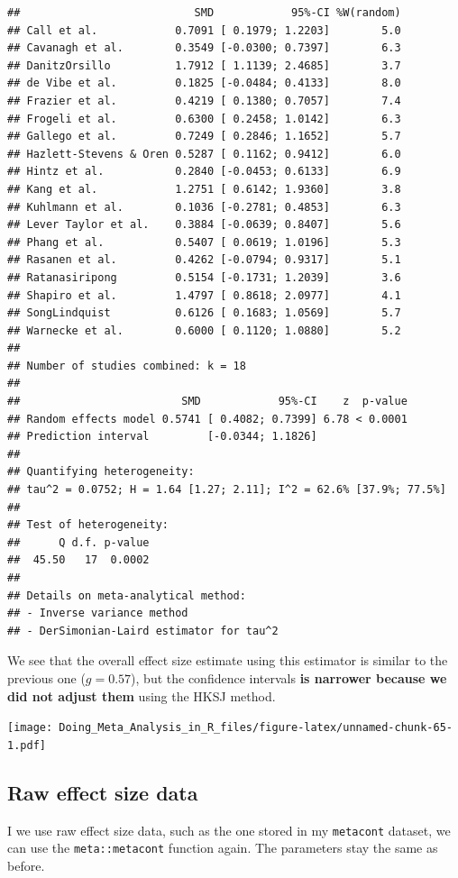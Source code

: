 \documentclass[]{book}
\begin{document}
\begin{verbatim}
##                           SMD            95%-CI %W(random)
## Call et al.            0.7091 [ 0.1979; 1.2203]        5.0
## Cavanagh et al.        0.3549 [-0.0300; 0.7397]        6.3
## DanitzOrsillo          1.7912 [ 1.1139; 2.4685]        3.7
## de Vibe et al.         0.1825 [-0.0484; 0.4133]        8.0
## Frazier et al.         0.4219 [ 0.1380; 0.7057]        7.4
## Frogeli et al.         0.6300 [ 0.2458; 1.0142]        6.3
## Gallego et al.         0.7249 [ 0.2846; 1.1652]        5.7
## Hazlett-Stevens & Oren 0.5287 [ 0.1162; 0.9412]        6.0
## Hintz et al.           0.2840 [-0.0453; 0.6133]        6.9
## Kang et al.            1.2751 [ 0.6142; 1.9360]        3.8
## Kuhlmann et al.        0.1036 [-0.2781; 0.4853]        6.3
## Lever Taylor et al.    0.3884 [-0.0639; 0.8407]        5.6
## Phang et al.           0.5407 [ 0.0619; 1.0196]        5.3
## Rasanen et al.         0.4262 [-0.0794; 0.9317]        5.1
## Ratanasiripong         0.5154 [-0.1731; 1.2039]        3.6
## Shapiro et al.         1.4797 [ 0.8618; 2.0977]        4.1
## SongLindquist          0.6126 [ 0.1683; 1.0569]        5.7
## Warnecke et al.        0.6000 [ 0.1120; 1.0880]        5.2
## 
## Number of studies combined: k = 18
## 
##                         SMD            95%-CI    z  p-value
## Random effects model 0.5741 [ 0.4082; 0.7399] 6.78 < 0.0001
## Prediction interval         [-0.0344; 1.1826]              
## 
## Quantifying heterogeneity:
## tau^2 = 0.0752; H = 1.64 [1.27; 2.11]; I^2 = 62.6% [37.9%; 77.5%]
## 
## Test of heterogeneity:
##      Q d.f. p-value
##  45.50   17  0.0002
## 
## Details on meta-analytical method:
## - Inverse variance method
## - DerSimonian-Laird estimator for tau^2
\end{verbatim}

We see that the overall effect size estimate using this estimator is similar to the previous one (\(g=0.57\)), but the confidence intervals \textbf{is narrower because we did not adjust them} using the HKSJ method.

\texttt{[image: Doing\_Meta\_Analysis\_in\_R\_files/figure-latex/unnamed-chunk-65-1.pdf]}

\hypertarget{random.raw}{%
\subsection{Raw effect size data}\label{random.raw}}

I we use raw effect size data, such as the one stored in my \texttt{metacont} dataset, we can use the \texttt{meta::metacont} function again. The parameters stay the same as before.
\end{document}
